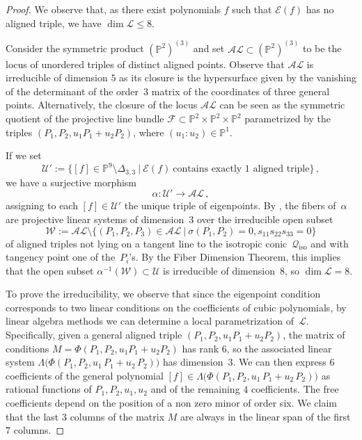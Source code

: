 \documentclass[a4paper, 11pt, reqno]{amsart}
\theoremstyle{plain}
\theoremstyle{definition}
\newcommand{\p}{\mathbb{P}}
\newcommand{\sL}{\mathcal{L}}
\newcommand{\sU}{\mathcal{U}}
\newcommand{\sF}{\mathcal{F}}
\newcommand{\iso}{\mathcal{Q}_{\mathrm{iso}}}
\newcommand{\Eig}[1]{\mathcal{E}\!\left( {#1} \right)}
\begin{document}
\begin{proof}
We observe that, as there exist
polynomials $f$ such that $\Eig{f}$ has no aligned triple, we have $\dim \sL \le 8$.

Consider the symmetric product $(\p^2)^{(3)}$ and set $\mathcal{AL} \subset (\p^2)^{(3)}$ to be the locus of unordered triples of distinct aligned points. Observe that $\mathcal{AL}$ is irreducible of dimension $5$ as its closure is the hypersurface given by the vanishing of the determinant of the order~$3$ matrix of the coordinates of three general points. Alternatively, the closure of the locus $\mathcal {AL}$ can be seen as the symmetric quotient of the projective line bundle $\sF \subset \p^2 \times \p^2 \times \p^2$ parametrized by the triples $(P_1, P_2, u_1 P_1 +u_2P_2)$, where $(u_1:u_2) \in \p^1$.

If we set
%
\[
  \sU':= \{[f]\in \p^9 \setminus \Delta_{3,3} \ | \ \Eig{f} \ \text{contains exactly $1$ aligned triple}\} \,,
\]
%
we have a surjective morphism
%
\[
  \alpha \colon \mathcal{U}' \to \mathcal{AL} \,,
\]
%
assigning to each $[f] \in \mathcal{U}'$ the unique triple of eigenpoints.
By , the fibers of~$\alpha$ are projective linear systems of dimension~$3$ over the irreducible open subset
%
\[
  \mathcal{W} := \mathcal{AL}
  \setminus \{(P_1,P_2,P_3) \in \mathcal{AL}
  \ | \ \sigma(P_1,P_2)=0, s_{11} s_{22} s_{33}=0\}
\]
%
of aligned triples not lying
on a tangent line to the isotropic conic~$\iso$ and with tangency point one of the~$P_i$'s.
By the Fiber Dimension Theorem, this implies that the open subset $\alpha^{-1} (\mathcal{W}) \subset \sU$ is irreducible of dimension~$8$, so $\dim \sL =8$.

To prove the irreducibility, we observe that since the eigenpoint condition corresponds to two linear conditions on the coefficients of cubic polynomials, by linear algebra methods we can determine a local parametrization of~$\sL$.
Specifically, given a general aligned triple $(P_1, P_2, u_1 P_1 +u_2P_2)$, the matrix of conditions $M=\Phi(P_1, P_2, u_1 P_1 +u_2P_2)$ has rank $6$, so the associated linear system
$\Lambda \bigl( \Phi(P_1, P_2, u_1 \, P_1 + u_2 \, P_2) \bigr)$ has dimension~$3$. We can then express $6$ coefficients of the general polynomial
$[f]\in \Lambda \bigl( \Phi(P_1, P_2, u_1 \, P_1 + u_2 \, P_2) \bigr)$ as rational functions of $P_1,P_2,u_1,u_2$ and of the remaining $4$ coefficients. The free coefficients depend on the position of a non zero minor of order six.
We claim that the last $3$ columns of the matrix
$M$ are always in the linear span of the first $7$ columns.


\end{proof}
\end{document}
